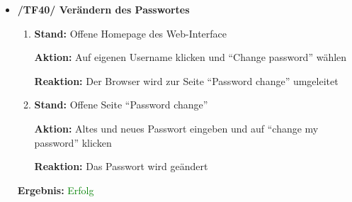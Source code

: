 \documentclass[a4paper]{scrreprt}
\begin{document}
\begin{itemize}
		      				\item \textbf{/TF40/ Ver\"andern des Passwortes}
		                              \begin{enumerate}
		                                  \item \par \textbf{Stand: }Offene Homepage des Web-Interface
		                                      \par \textbf{Aktion: }Auf eigenen Username klicken und ``Change password'' w\"ahlen
		                                      \par \textbf{Reaktion: }Der Browser wird zur Seite ``Password change'' umgeleitet
		      							\item \par \textbf{Stand: }Offene Seite ``Password change''
		                                      \par \textbf{Aktion: }Altes und neues Passwort eingeben und auf ``change my password'' klicken
		                                      \par \textbf{Reaktion: }Das Passwort wird ge\"andert
		                              \end{enumerate}		
		      		           \vspace*{0.3cm}
		      		           \par \textbf{Ergebnis: }\textcolor{green}{Erfolg}
		      		           \vspace*{0.6cm}		
		      		

\end{itemize}
\end{document}

